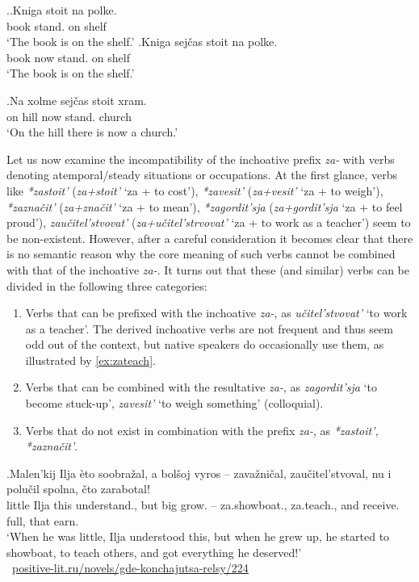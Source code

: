 \ex.\label{ex:stojat':kniga}\ag.Kniga stoit na polke.\\
book stand. on shelf\\
\trans `The book is on the shelf.'
\bg.Kniga sej\v{c}as stoit na polke.\\
book now stand. on shelf\\
\trans `The book is on the shelf.'

\exg.\label{ex:stojat':xram3}Na xolme sej\v{c}as stoit xram.\\
on hill now stand. church\\
\trans `On the hill there is now a church.'

Let us now examine the incompatibility of the inchoative prefix \textit{za-} with verbs denoting atemporal/steady situations or occupations. At the first glance, verbs like \textit{*zastoit'} (\textit{za+stoit'} `za + to cost'), \textit{*zavesit'} (\textit{za+vesit'} `za + to weigh'), \textit{*zazna\v{c}it'} (\textit{za+zna\v{c}it'} `za + to mean'), \textit{*zagordit'sja} (\textit{za+gordit'sja} `za + to feel proud'), \textit{zau\v{c}itel'stvovat'} (\textit{za+u\v{c}itel'strvovat'} `za + to work as a teacher') seem to be non-existent. However, after a careful consideration it becomes clear that there is no semantic reason why the core meaning of such verbs cannot be combined with that of the inchoative \textit{za-}. It turns out that these (and similar) verbs can be divided in the following three categories:

\begin{enumerate}
\item Verbs that can be prefixed with the inchoative \textit{za-}, as \textit{u\v{c}itel'stvovat'} `to work as a teacher'. The derived inchoative verbs are not frequent and thus seem odd out of the context, but native speakers do occasionally use them, as illustrated by \ref{ex:zateach}.
\item Verbs that can be combined with the resultative \textit{za-}, as \textit{zagordit'sja} `to become stuck-up', \textit{zavesit'} `to weigh something' (colloquial).
\item Verbs that do not exist in combination with the prefix \textit{za-}, as \textit{*zastoit', *zazna\v{c}it'}.
\end{enumerate}

\exg.\label{ex:zateach}Malen'kij Ilja \`{e}to soobra\v{z}al, a bol\v{s}oj vyros -- zava\v{z}ni\v{c}al, zau\v{c}itel'stvoval, {nu i} polu\v{c}il spolna, \v{c}to zarabotal!\\
little Ilja this understand., but big grow. -- za.showboat., za.teach., {and} receive. full, that earn.\\
\trans `When he was little, Ilja understood this, but when he grew up, he started to showboat, to teach others, and got everything he deserved!'\\\hbox{}\hfill\hbox{
\url{positive-lit.ru/novels/gde-konchajutsa-relsy/224}}

